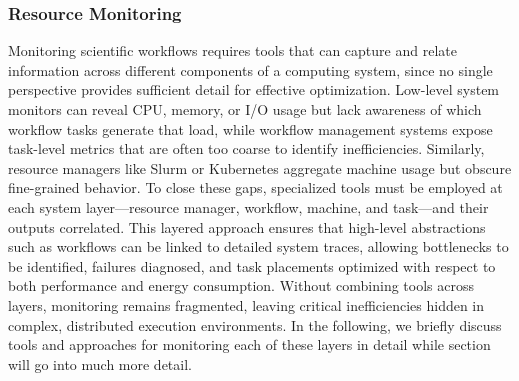 \subsubsection{Resource Monitoring}
\label{sec:background_monitoring_resource}
Monitoring scientific workflows requires tools that can capture and relate information across different components of a computing system, since no single perspective provides sufficient detail for effective optimization. Low-level system monitors can reveal CPU, memory, or I/O usage but lack awareness of which workflow tasks generate that load, while workflow management systems expose task-level metrics that are often too coarse to identify inefficiencies. Similarly, resource managers like Slurm or Kubernetes aggregate machine usage but obscure fine-grained behavior. To close these gaps, specialized tools must be employed at each system layer—resource manager, workflow, machine, and task—and their outputs correlated. This layered approach ensures that high-level abstractions such as workflows can be linked to detailed system traces, allowing bottlenecks to be identified, failures diagnosed, and task placements optimized with respect to both performance and energy consumption. Without combining tools across layers, monitoring remains fragmented, leaving critical inefficiencies hidden in complex, distributed execution environments. In the following, we briefly discuss tools and approaches for monitoring each of these layers in detail while section %
will go into much more detail.

